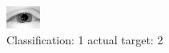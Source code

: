 \begin{figure}[h!]
\begin{center}
\includegraphics[width=0.60\columnwidth]{figures/ID2360_class_1_target_2.png}
\end{center}
\caption{ Classification: 1 actual target: 2}
\label{fig:ID2360_class_1_target_2}
\end{figure}

